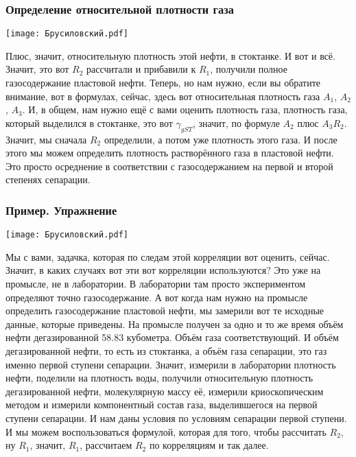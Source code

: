 \documentclass[main.tex]{subfiles}
\begin{document}
\subsubsection{Определение относительной плотности газа}

\begin{center}
\texttt{[image: Брусиловский.pdf]}
\end{center}

Плюс, значит, относительную плотность этой нефти, в стоктанке.
И вот и всё.
Значит, это вот $R_2$ рассчитали и прибавили к $R_1$, получили полное газосодержание пластовой нефти.
Теперь, но нам нужно, если вы обратите внимание, вот в формулах, сейчас, здесь вот относительная плотность газа $A_1$, $A_2$, $A_3$.
И, в общем, нам нужно ещё с вами оценить плотность газа, плотность газа, который выделился в стоктанке, это вот $\gamma_{gST}$, значит, по формуле $A_2$ плюс $A_3R_2$.
Значит, мы сначала $R_2$ определили, а потом уже плотность этого газа.
И после этого мы можем определить плотность растворённого газа в пластовой нефти.
Это просто осреднение в соответствии с газосодержанием на первой и второй степенях сепарации.

\subsubsection{Пример. Упражнение}

\begin{center}
\texttt{[image: Брусиловский.pdf]}
\end{center}

Мы с вами, задачка, которая по следам этой корреляции вот оценить, сейчас.
Значит, в каких случаях вот эти вот корреляции используются?
Это уже на промысле, не в лаборатории.
В лаборатории там просто экспериментом определяют точно газосодержание.
А вот когда нам нужно на промысле определить газосодержание пластовой нефти, мы замерили вот те исходные данные, которые приведены.
На промысле получен за одно и то же время объём нефти дегазированной 58.83 кубометра.
Объём газа соответствующий.
И объём дегазированной нефти, то есть из стоктанка, а объём газа сепарации, это газ именно первой ступени сепарации.
Значит, измерили в лаборатории плотность нефти, поделили на плотность воды, получили относительную плотность дегазированной нефти, молекулярную массу её, измерили криоскопическим методом и измерили компонентный состав газа, выделившегося на первой ступени сепарации.
И нам даны условия по условиям сепарации первой ступени.
И мы можем воспользоваться формулой, которая для того, чтобы рассчитать $R_2$, ну $R_1$, значит, $R_1$, рассчитаем $R_2$ по корреляциям и так далее.
\end{document}
